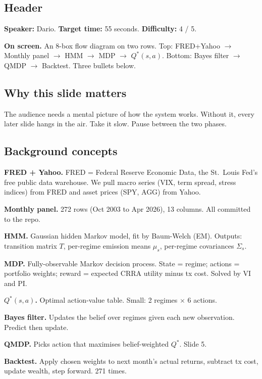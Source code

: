 \documentclass[11pt]{article}
\begin{document}
\subsection*{Header}

\textbf{Speaker:} Dario. \quad\textbf{Target time:} 55 seconds. \quad\textbf{Difficulty:} 4 / 5.

\textbf{On screen.} An 8-box flow diagram on two rows. Top: FRED+Yahoo $\to$ Monthly panel $\to$ HMM $\to$ MDP $\to$ $Q^*(s, a)$. Bottom: Bayes filter $\to$ QMDP $\to$ Backtest. Three bullets below.

\subsection*{Why this slide matters}

The audience needs a mental picture of how the system works. Without it, every later slide hangs in the air. Take it slow. Pause between the two phases.

\subsection*{Background concepts}

\textbf{FRED + Yahoo.} FRED = Federal Reserve Economic Data, the St.\ Louis Fed's free public data warehouse. We pull macro series (VIX, term spread, stress indices) from FRED and asset prices (SPY, AGG) from Yahoo.

\textbf{Monthly panel.} 272 rows (Oct 2003 to Apr 2026), 13 columns. All committed to the repo.

\textbf{HMM.} Gaussian hidden Markov model, fit by Baum-Welch (EM). Outputs: transition matrix $T$, per-regime emission means $\mu_s$, per-regime covariances $\Sigma_s$.

\textbf{MDP.} Fully-observable Markov decision process. State = regime; actions = portfolio weights; reward = expected CRRA utility minus tx cost. Solved by VI and PI.

\textbf{$Q^*(s, a)$.} Optimal action-value table. Small: 2 regimes $\times$ 6 actions.

\textbf{Bayes filter.} Updates the belief over regimes given each new observation. Predict then update.

\textbf{QMDP.} Picks action that maximises belief-weighted $Q^*$. Slide 5.

\textbf{Backtest.} Apply chosen weights to next month's actual returns, subtract tx cost, update wealth, step forward. 271 times.
\end{document}
